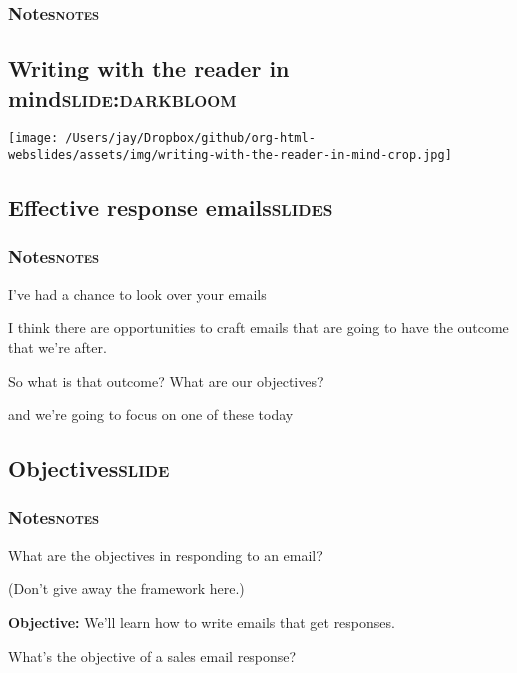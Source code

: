 \documentclass[12pt]{article}
\begin{document}
\subsubsection[Notes]{Notes\hfill{}\textsc{notes}}
\label{sec:orge969856}

\subsection[Writing with the reader in mind]{Writing with the reader in mind\hfill{}\textsc{slide:darkbloom}}
\label{sec:org02d4698}
\begin{center}
\texttt{[image: /Users/jay/Dropbox/github/org-html-webslides/assets/img/writing-with-the-reader-in-mind-crop.jpg]}
\end{center}

\subsection[Effective response emails]{Effective response emails\hfill{}\textsc{slides}}
\label{sec:orga15084d}

\subsubsection[Notes]{Notes\hfill{}\textsc{notes}}
\label{sec:org956f21d}
I've had a chance to look over your emails

I think there are opportunities to craft emails that are going to have the outcome that we're after.

So what is that outcome? What are our objectives?

and we're going to focus on one of these today

\subsection[Objectives]{Objectives\hfill{}\textsc{slide}}
\label{sec:org5e7cf9e}
\subsubsection[Notes]{Notes\hfill{}\textsc{notes}}
\label{sec:org8e8ed5d}
What are the objectives in responding to an email?

(Don't give away the framework here.)

\textbf{Objective:} We'll learn how to write emails that get responses.

What's the objective of a sales email response?
\end{document}
